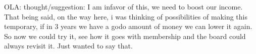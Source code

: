 \documentclass[12pt, a4paper]{article}
\begin{document}









OLA: thought/suggestion: I am infavor of this, we need to boost our income. That being said, on the way here, i was thinking of possibilities of making this temporary, if in 3 years we have a godo amount of money we can lower it again. So now we could try it, see how it goes with membership and the board could always revisit it. Just wanted to say that. 
\end{document}
